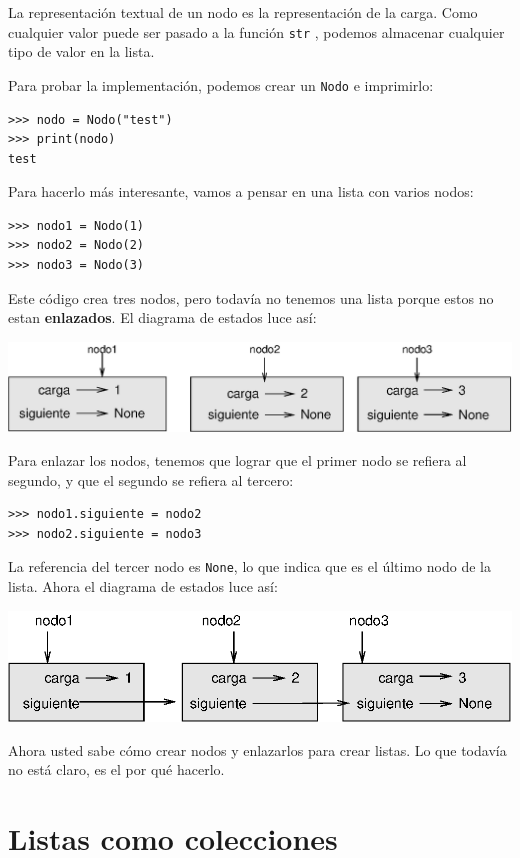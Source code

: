 La representación textual de un nodo es la representación de la carga.
Como cualquier valor puede ser pasado a la función \texttt{str} ,
podemos almacenar cualquier tipo de valor en la lista.

Para probar la implementación, podemos crear un \texttt{Nodo} e imprimirlo:

\beforeverb 
\begin{verbatim}
>>> nodo = Nodo("test")
>>> print(nodo)
test
\end{verbatim}
\afterverb Para hacerlo más interesante, vamos a pensar en una lista
con varios nodos:

\beforeverb 
\begin{verbatim}
>>> nodo1 = Nodo(1)
>>> nodo2 = Nodo(2)
>>> nodo3 = Nodo(3)
\end{verbatim}
\afterverb Este código crea tres nodos, pero todavía no tenemos una
lista porque estos no estan \textbf{enlazados}. El diagrama de estados
luce así:

\beforefig \centerline{\includegraphics[scale=0.7]{illustrations/link1}}
\afterfig

Para enlazar los nodos, tenemos que lograr que el primer nodo se refiera
al segundo, y que el segundo se refiera al tercero:

\beforeverb 
\begin{verbatim}
>>> nodo1.siguiente = nodo2
>>> nodo2.siguiente = nodo3
\end{verbatim}
\afterverb La referencia del tercer nodo es \texttt{None}, lo que
indica que es el último nodo de la lista. Ahora el diagrama de estados
luce así:

\beforefig \centerline{\includegraphics[scale=0.9]{illustrations/link2}}
\afterfig

Ahora usted sabe cómo crear nodos y enlazarlos para crear listas.
Lo que todavía no está claro, es el por qué hacerlo.

\section{Listas como colecciones}

